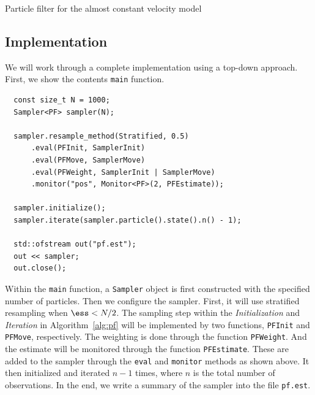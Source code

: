 \begin{algorithm}[t]
  \caption{Particle filter for the almost constant velocity model}
  \label{alg:pf}
\end{algorithm}

\subsection{Implementation}
\label{sub:Implementation (PF)}

We will work through a complete implementation using a top-down approach.
First, we show the contents \verb|main| function.
\begin{Verbatim}
  const size_t N = 1000;
  Sampler<PF> sampler(N);

  sampler.resample_method(Stratified, 0.5)
      .eval(PFInit, SamplerInit)
      .eval(PFMove, SamplerMove)
      .eval(PFWeight, SamplerInit | SamplerMove)
      .monitor("pos", Monitor<PF>(2, PFEstimate));

  sampler.initialize();
  sampler.iterate(sampler.particle().state().n() - 1);

  std::ofstream out("pf.est");
  out << sampler;
  out.close();
\end{Verbatim}
Within the \verb|main| function, a \verb|Sampler| object is first constructed
with the specified number of particles. Then we configure the sampler. First,
it will use stratified resampling when $\ess < N / 2$. The sampling step within
the \emph{Initialization} and \emph{Iteration} in Algorithm~\ref{alg:pf} will
be implemented by two functions, \verb|PFInit| and \verb|PFMove|, respectively.
The weighting is done through the function \verb|PFWeight|. And the estimate
will be monitored through the function \verb|PFEstimate|. These are added to
the sampler through the \verb|eval| and \verb|monitor| methods as shown above.
It then initialized and iterated $n - 1$ times, where $n$ is the total number
of observations. In the end, we write a summary of the sampler into the file
\verb|pf.est|.

